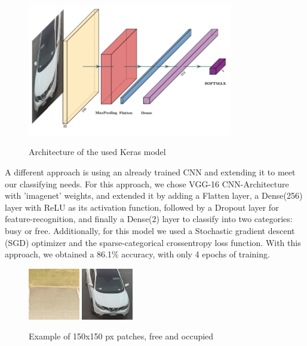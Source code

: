 \documentclass[12pt]{article}
\begin{document}
\begin{figure}
\caption{Architecture of the used Keras model}
\includegraphics[width=0.8\textwidth]{Architecture}
\label{fig:architectureimg}
\end{figure}

\par
A different approach is using an already trained CNN and extending it to meet our classifying needs.
For this approach, we chose VGG-16 CNN-Architecture with 'imagenet' weights, and extended it by adding a Flatten layer, a Dense(256) layer with ReLU as its activation
function, followed by a Dropout layer for feature-recognition, and finally a Dense(2) layer to classify into two categories: busy or free.
Additionally, for this model we used a Stochastic gradient descent (SGD) optimizer and the sparse-categorical crossentropy loss function.
With this approach, we obtained a 86.1\% accuracy, with only 4 epochs of training.

\begin{figure}
\caption{Example of 150x150 px patches, free and occupied}
\includegraphics[width=0.2\textwidth]{20150703_0810_10}
\includegraphics[width=0.2\textwidth]{20150703_0810_45}
\label{fig:patchesimg}
\end{figure}
\end{document}
